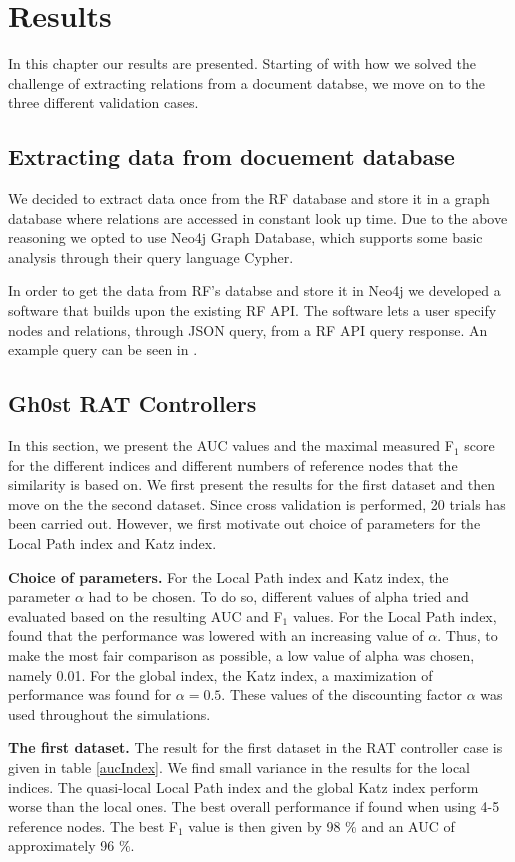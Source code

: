 \chapter{Results}
In this chapter our results are presented. Starting of with how we solved the challenge of extracting relations from a document databse, we move on to the three different validation cases.

\section{Extracting data from docuement database}
We decided to extract data once from the RF database and store it in a graph database where relations are accessed in constant look up time. Due to the above reasoning we opted to use Neo4j Graph Database, which supports some basic analysis through their query language Cypher.

In order to get the data from RF's databse and store it in Neo4j we developed a software that builds upon the existing RF API. The software lets a user specify nodes and relations, through JSON query, from a RF API query response. An example query can be seen in .

\section{Gh0st RAT Controllers}
In this section, we present the AUC values and the maximal measured F$_1$ score for the different indices and different numbers of reference nodes that the similarity is based on. We first present the results for the first dataset and then move on the the second dataset. Since cross validation is performed, 20 trials has been carried out. However, we first motivate out choice of parameters for the Local Path index and Katz index.

\textbf{Choice of parameters.} For the Local Path index and Katz index,  the parameter $\alpha$ had to be chosen. To do so, different values of alpha  tried and evaluated based on the resulting AUC and F$_1$ values. For the Local Path index, found that the performance was lowered with an increasing value of $\alpha$. Thus, to make the most fair comparison as possible, a low value of alpha was chosen, namely 0.01. For the global index, the Katz index, a maximization of performance was found for $\alpha=0.5$. These values of the discounting factor $\alpha$ was used throughout the simulations. 

\textbf{The first dataset.} The result for the first dataset in the RAT controller case is given in table \ref{aucIndex}. We find small variance in the results for the local indices. The quasi-local Local Path index and the global Katz index perform worse than the local ones. The best overall performance if found when using 4-5 reference nodes. The best F$_1$ value is then given by 98 \% and an AUC of approximately 96 \%. 


